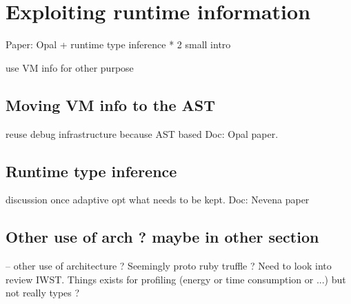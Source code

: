 \documentclass[a4paper,12pt,twoside]{../includes/ThesisStyle}
\begin{document}
\fi

\chapter{Exploiting runtime information}
\label{chap:exploitation}
\minitoc

Paper: Opal + runtime type inference * 2
small intro

use VM info for other purpose

\section{Moving VM info to the AST}
reuse debug infrastructure because AST based
Doc: Opal paper.

\section{Runtime type inference}

discussion once adaptive opt what needs to be kept.
Doc: Nevena paper

\section{Other use of arch ? maybe in other section}
-- other use of architecture ? Seemingly proto ruby truffle ? Need to look into review IWST. Things exists for profiling (energy or time consumption or ...) but not really types ?

\ifx\wholebook\relax\else
    
\end{document}
